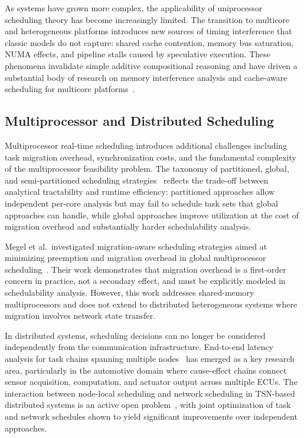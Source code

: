 As systems have grown more complex, the applicability of uniprocessor scheduling
theory has become increasingly limited. The transition to multicore and heterogeneous
platforms introduces new sources of timing interference that classic models do not
capture: shared cache contention, memory bus saturation, NUMA effects, and
pipeline stalls caused by speculative execution. These phenomena invalidate simple
additive compositional reasoning and have driven a substantial body of research on
memory interference analysis and cache-aware scheduling for multicore
platforms~\cite{mancuso2013,hoornaert2024}.

\subsection{Multiprocessor and Distributed Scheduling}
\label{subsec:rw_mp_scheduling}

Multiprocessor real-time scheduling introduces additional challenges including task
migration overhead, synchronization costs, and the fundamental complexity of the
multiprocessor feasibility problem. The taxonomy of partitioned, global, and
semi-partitioned scheduling strategies~\cite{davis2011} reflects the trade-off between
analytical tractability and runtime efficiency: partitioned approaches allow
independent per-core analysis but may fail to schedule task sets that global approaches
can handle, while global approaches improve utilization at the cost of migration
overhead and substantially harder schedulability analysis.

Megel et al.\ investigated migration-aware scheduling strategies aimed at minimizing
preemption and migration overhead in global multiprocessor scheduling~\cite{megel2010}.
Their work demonstrates that migration overhead is a first-order concern in practice,
not a secondary effect, and must be explicitly modeled in schedulability analysis.
However, this work addresses shared-memory multiprocessors and does not extend to
distributed heterogeneous systems where migration involves network state transfer.

In distributed systems, scheduling decisions can no longer be considered independently
from the communication infrastructure. End-to-end latency analysis for task chains
spanning multiple nodes~\cite{durr2019} has emerged as a key research area,
particularly in the automotive domain where cause-effect chains connect sensor
acquisition, computation, and actuator output across multiple ECUs. The interaction
between node-local scheduling and network scheduling in TSN-based distributed
systems is an active open problem~\cite{craciunas2016}, with joint optimization
of task and network schedules shown to yield significant improvements over
independent approaches.

